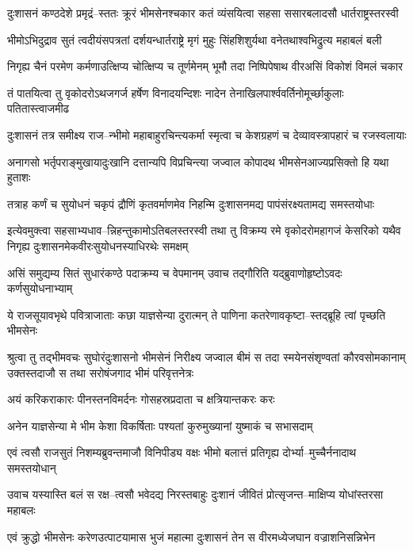 \twolineshloka
{दुःशासनं कण्ठदेशे प्रमृद्रं--स्ततः क्रूरं भीमसेनश्चकार}
{कतं व्यंसयित्वा सहसा ससारबलादसौ धार्तराष्ट्रस्तरस्वी}


\twolineshloka
{भीमोऽभिदुद्राव सुतं त्वदीयंसपत्रतां दर्शयन्धार्तराष्ट्रे}
{मृगं मुहुः सिंहशिशुर्यथा वनेतथाश्वभिद्रुत्य महाबलं बली}


\twolineshloka
{निगृह्य चैनं परमेण कर्मणाउत्क्षिप्य चोत्क्षिप्य च तूर्णमेनम्}
{भूमौ तदा निष्पिपेषाथ वीरअसिं विकोशं विमलं चकार}


\twolineshloka
{तं पातयित्वा तु वृकोदरोऽथजगर्ज हर्षेण विनादयन्दिशः}
{नादेन तेनाखिलपार्श्ववर्तिनोमूर्च्छाकुलाः पतितास्त्वाजमीढ}


\twolineshloka
{दुःशासनं तत्र समीक्ष्य राज--न्भीमो महाबाहुरचिन्त्यकर्मा}
{स्मृत्वा च केशग्रहणं च देव्यावस्त्रापहारं च रजस्वलायाः}


\twolineshloka
{अनागसो भर्तृपराङ्मुखायादुःखानि दत्तान्यपि विप्रचिन्त्या}
{जज्वाल कोपादथ भीमसेनआज्यप्रसिक्तो हि यथा हुताशः}


\twolineshloka
{तत्राह कर्णं च सुयोधनं चकृपं द्रौणिं कृतवर्माणमेव}
{निहन्मि दुःशासनमद्य पापंसंरक्ष्यतामद्य समस्तयोधाः}


\threelineshloka
{इत्येवमुक्त्वा सहसाभ्यधाव--न्निहन्तुकामोऽतिबलस्तरस्वी}
{तथा तु विक्रम्य रमे वृकोदरोमहागजं केसरिको यथैव}
{निगृह्य दुःशासनमेकवीरःसुयोधनस्याधिरथेः समक्षम्}


\twolineshloka
{असिं समुद्यम्य सितं सुधारंकण्ठे पदाक्रम्य च वेपमानम्}
{उवाच तद्गौरिति यद्ब्रुवाणोहृष्टोऽवदः कर्णसुयोधनाभ्याम्}


\twolineshloka
{ये राजसूयावभृथे पवित्राजाताः कछा याज्ञसेन्या दुरात्मन्}
{ते पाणिना कतरेणावकृष्टा--स्तद्ब्रूहि त्वां पृच्छति भीमसेनः}


\threelineshloka
{श्रुत्वा तु तद्भीमवचः सुघोरंदुःशासनो भीमसेनं निरीक्ष्य}
{जज्वाल बीमं स तदा स्मयेनसंशृण्वतां कौरवसोमकानाम्}
{उक्तस्तदाजौ स तथा सरोषंजगाद भीमं परिवृत्तनेत्रः}


\twolineshloka
{अयं करिकराकारः पीनस्तनविमर्दनः}
{गोसहस्रप्रदाता च क्षत्रियान्तकरः करः}


\twolineshloka
{अनेन याज्ञसेन्या मे भीम केशा विकर्षिताः}
{पश्यतां कुरुमुख्यानां युष्माकं च सभासदाम्}


\twolineshloka
{एवं त्वसौ राजसुतं निशम्यब्रुवन्तमाजौ विनिपीड्य वक्षः}
{भीमो बलात्तं प्रतिगृह्य दोर्भ्या--मुच्चैर्ननादाथ समस्तयोधान्}


\twolineshloka
{उवाच यस्यास्ति बलं स रक्ष--त्वसौ भवेदद्य निरस्तबाहुः}
{दुःशानं जीवितं प्रोत्सृजन्त--माक्षिप्य योधांस्तरसा महाबलः}


\twolineshloka
{एवं क्रुद्धो भीमसेनः करेणउत्पाटयामास भुजं महात्मा}
{दुःशासनं तेन स वीरमध्येजघान वज्राशनिसन्निभेन}


